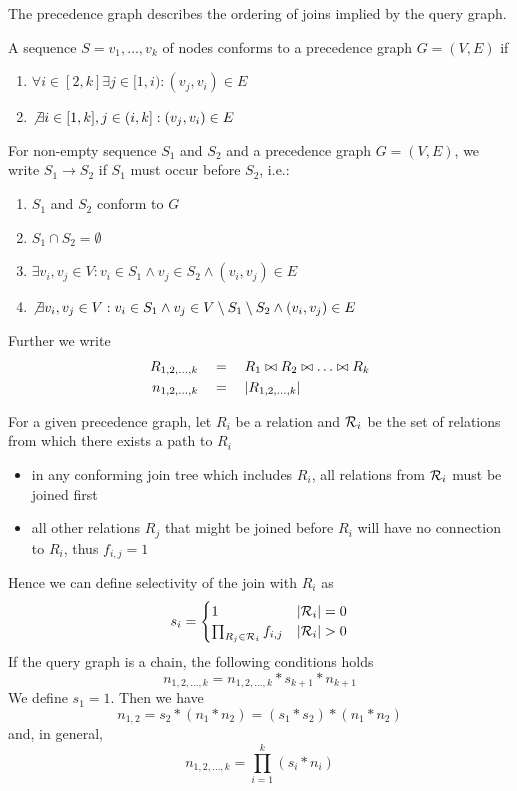 \documentclass[11pt]{article}
\begin{document}
The precedence graph describes the ordering of joins implied by the query graph.

A sequence \(S=v_1,\dots,v_k\) of nodes conforms to a precedence graph \(G=(V,E)\) if
\begin{enumerate}
\item \(\forall i\in[2,k]\exists j\in[1,i):(v_j,v_i)\in E\)
\item \(\not\exists i\in[1,k],j\in(i,k]:(v_j,v_i)\in E\)
\end{enumerate}

For non-empty sequence \(S_1\) and \(S_2\) and a precedence graph \(G=(V,E)\), we write \(S_1\to S_2\) if \(S_1\)
must occur before \(S_2\), i.e.:
\begin{enumerate}
\item \(S_1\) and \(S_2\) conform to \(G\)
\item \(S_1\cap S_2=\emptyset\)
\item \(\exists v_i,v_j\in V:v_i\in S_1\wedge v_j\in S_2\wedge(v_i,v_j)\in E\)
\item \(\not\exists v_i,v_j\in V:v_i\in S_1\wedge v_j\in V\setminus S_1\setminus S_2\wedge(v_i,v_j)\in E\)
\end{enumerate}
Further we write
\begin{align*}
R_{1,2,\dots,k}&\quad=\quad R_1\bowtie R_2\bowtie\dots\bowtie R_k\\
n_{1,2,\dots,k}&\quad=\quad \abs{R_{1,2,\dots,k}}
\end{align*}

For a given precedence graph, let \(R_i\) be a relation and \(\mathcal{R}_i\) be the set of relations from which there
exists a path to \(R_i\)
\begin{itemize}
\item in any conforming join tree which includes \(R_i\), all relations from \(\mathcal{R}_i\) must be joined first
\item all other relations \(R_j\) that might be joined before \(R_i\) will have no connection to \(R_i\),
thus \(f_{i,j}=1\)
\end{itemize}

Hence we can define selectivity of the join with \(R_i\) as
\begin{equation*}
s_i=
\begin{cases}
1&\abs{\calr_i}=0\\
\prod_{R_j\in\calr_i}f_{i,j}&\abs{\calr_i}>0
\end{cases}
\end{equation*}
If the query graph is a chain, the following conditions holds
\begin{equation*}
n_{1,2,\dots,k}=n_{1,2,\dots,k}*s_{k+1}*n_{k+1}
\end{equation*}
We define \(s_1=1\). Then we have
\begin{equation*}
n_{1,2}=s_2*(n_1*n_2)=(s_1*s_2)*(n_1*n_2)
\end{equation*}
and, in general,
\begin{equation*}
n_{1,2,\dots,k}=\prod_{i=1}^k(s_i*n_i)
\end{equation*}
\end{document}
